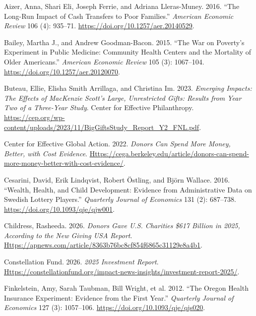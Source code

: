 \documentclass[
  11pt,
  letterpaper,
  DIV=11,
  numbers=noendperiod]{scrartcl}
\newlength{\cslhangindent}
\newenvironment{CSLReferences}[2] %
 {\begin{list}{}{%
  \setlength{\itemindent}{0pt}
  \setlength{\leftmargin}{0pt}
  \setlength{\parsep}{0pt}
  \ifodd #1
   \setlength{\leftmargin}{\cslhangindent}
   \setlength{\itemindent}{-1\cslhangindent}
  \fi
  \setlength{\itemsep}{#2\baselineskip}}}
 {\end{list}}
\begin{document}
\protect{}\label{refs}
\begin{CSLReferences}{1}{1}
Aizer, Anna, Shari Eli, Joseph Ferrie, and Adriana Lleras-Muney. 2016.
{``The Long-Run Impact of Cash Transfers to Poor Families.''}
\emph{American Economic Review} 106 (4): 935--71.
\url{https://doi.org/10.1257/aer.20140529}.

Bailey, Martha J., and Andrew Goodman-Bacon. 2015. {``The {W}ar on
{P}overty's Experiment in Public Medicine: Community Health Centers and
the Mortality of Older {A}mericans.''} \emph{American Economic Review}
105 (3): 1067--104. \url{https://doi.org/10.1257/aer.20120070}.

Buteau, Ellie, Elisha Smith Arrillaga, and Christina Im. 2023.
\emph{Emerging Impacts: The Effects of {M}ac{K}enzie {S}cott's Large,
Unrestricted Gifts: Results from Year Two of a Three-Year Study}. Center
for Effective Philanthropy.
\url{https://cep.org/wp-content/uploads/2023/11/BigGiftsStudy_Report_Y2_FNL.pdf}.

Center for Effective Global Action. 2022. \emph{Donors Can Spend More
Money, Better, with Cost Evidence}.
\href{https://cega.berkeley.edu/article/donors-can-spend-more-money-better-with-cost-evidence/}{Https://cega.berkeley.edu/article/donors-can-spend-more-money-better-with-cost-evidence/}.

Cesarini, David, Erik Lindqvist, Robert Östling, and Björn Wallace.
2016. {``Wealth, Health, and Child Development: Evidence from
Administrative Data on {S}wedish Lottery Players.''} \emph{Quarterly
Journal of Economics} 131 (2): 687--738.
\url{https://doi.org/10.1093/qje/qjw001}.

Childress, Rasheeda. 2026. \emph{Donors Gave {U.S.} Charities \$617
Billion in 2025, According to the New Giving {USA} Report}.
\href{https://apnews.com/article/8363b76bc8cf854f6865c31129e8a4b1}{Https://apnews.com/article/8363b76bc8cf854f6865c31129e8a4b1}.

Constellation Fund. 2026. \emph{2025 Investment Report}.
\href{https://constellationfund.org/impact-news-insights/investment-report-2025/}{Https://constellationfund.org/impact-news-insights/investment-report-2025/}.

Finkelstein, Amy, Sarah Taubman, Bill Wright, et al. 2012. {``The
{O}regon Health Insurance Experiment: Evidence from the First Year.''}
\emph{Quarterly Journal of Economics} 127 (3): 1057--106.
\url{https://doi.org/10.1093/qje/qjs020}.


\end{CSLReferences}
\end{document}
